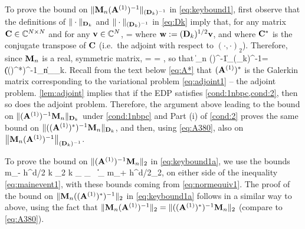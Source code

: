 To prove the bound on $\|\mathbf{M}_n(\mathbf{A}^{(1)})^{-1}\|_{(\mathbf{D}_k)^{-1}}$ in \cref{eq:keybound1}, first observe that the definitions of $\|\cdot\|_{\mathbf{D}_k}$ and $\|\cdot\|_{(\mathbf{D}_k)^{-1}}$ in \cref{eq:Dk} imply that, for any matrix $\mathbf{C} \in \mathbb C^{N\times N}$ and for any $\mathbf{v}\in \mathbb C^N$,
\beq\label{eq:A380-0}
 = 
\eeq
where $\mathbf{w} := (\mathbf{D}_k)^{1/2}\mathbf{v}$, and where $\mathbf{C}^*$ is the conjugate transpose of $\mathbf{C}$ (i.e.~the adjoint with respect to $(\cdot,\cdot)_2$).
Therefore, since $\mathbf{M}_n$ is a real, symmetric matrix,
\beqs
{}
=
\frac{\NDk{\mleft(\AmatoI\Mmatn\mright)^* \bw}}{\NDk{\bw}}
= 
,
 \eeqs
 so that 
\beq\label{eq:A380} 
 \big\|\Mmat_n (\Amato)^{-1}\big\|_{(\Dmat_k)^{-1}}=\big\|((\Amato)^*)^{-1}\Mmat_n\big\|_{\Dmat_k}.
 \eeq 
Recall from the text below \cref{eq:A*} that $(\mathbf{A}^{(1)})^*$ is the Galerkin matrix corresponding to the variational problem \cref{eq:adjoint1} -- the adjoint problem. \cref{lem:adjoint} implies that if the EDP %
satisfies \cref{cond:1nbpc,cond:2}, then so does the adjoint problem. Therefore, the argument above leading to the bound on $\|(\mathbf{A}^{(1)})^{-1}\mathbf{M}_n\|_{\mathbf{D}_k}$ under \cref{cond:1nbpc} and Part (i) of \cref{cond:2} proves the same bound on $\|((\mathbf{A}^{(1)})^*)^{-1}\mathbf{M}_n\|_{\mathbf{D}_k}$, and then, using \cref{eq:A380}, also on $\big\|\mathbf{M}_n(\mathbf{A}^{(1)})^{-1}\big\|_{(\mathbf{D}_k)^{-1}}$.

To prove the bound on  $\|(\mathbf{A}^{(1)})^{-1}\mathbf{M}_n\|_{2}$ in \cref{eq:keybound1a}, we use the bounds 
\beqs
m_- h^{d/2} k \N{\tbu}_2 \leq k _{\LtDR} \leq {}_{\HokDR}
\,\tand\,
\big\|\big\|_{\LtDR} \leq m_+ h^{d/2}\N{\bff}_2,
\eeqs
on either side of the inequality \cref{eq:mainevent1}, with these bounds coming from \cref{eq:normequiv1}. The proof of the bound on 
$\|\mathbf{M}_n((\mathbf{A}^{(1)})^*)^{-1}\|_{2}$ in \cref{eq:keybound1a} follows in a similar way to above, using the fact that 
$\|\mathbf{M}_n (\mathbf{A}^{(1)})^{-1}\|_2=\|((\mathbf{A}^{(1)})^*)^{-1}\mathbf{M}_n\|_2$ (compare to \cref{eq:A380}).
%
%
\epf


